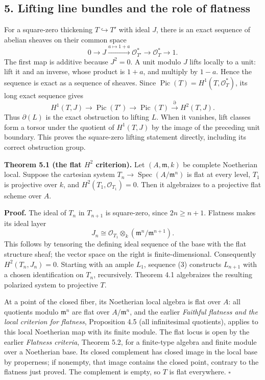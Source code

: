 \documentclass[11pt]{article}
\begin{document}
\subsection{5. Lifting line bundles and the role of
flatness}\label{lifting-line-bundles-and-the-role-of-flatness}

For a square-zero thickening \(T\hookrightarrow T'\) with ideal \(J\),
there is an exact sequence of abelian sheaves on their common space \[
0\to J\xrightarrow{a\mapsto1+a}\mathcal O_{T'}^*
\to\mathcal O_T^*\to1.
\tag{2}
\] The first map is additive because \(J^2=0\). A unit modulo \(J\)
lifts locally to a unit: lift it and an inverse, whose product is
\(1+a\), and multiply by \(1-a\). Hence the sequence is exact as a
sequence of sheaves. Since
\(\operatorname{Pic}(T)=H^1(T,\mathcal O_T^*)\), its long exact sequence
gives \[
H^1(T,J)\to\operatorname{Pic}(T')\to\operatorname{Pic}(T)
\xrightarrow{\partial}H^2(T,J).
\tag{3}
\] Thus \(\partial(L)\) is the exact obstruction to lifting \(L\). When
it vanishes, lift classes form a torsor under the quotient of
\(H^1(T,J)\) by the image of the preceding unit boundary. This proves
the square-zero lifting statement directly, including its correct
obstruction group.

\textbf{Theorem 5.1 (the flat \(H^2\) criterion).} Let
\((A,\mathfrak m,k)\) be complete Noetherian local. Suppose the
cartesian system \(T_n\to\operatorname{Spec}(A/\mathfrak m^n)\) is flat
at every level, \(T_1\) is projective over \(k\), and
\(H^2(T_1,\mathcal O_{T_1})=0\). Then it algebraizes to a projective
flat scheme over \(A\).

\textbf{Proof.} The ideal of \(T_n\) in \(T_{n+1}\) is square-zero,
since \(2n\geq n+1\). Flatness makes its ideal layer \[
J_n\cong\mathcal O_{T_1}\otimes_k
(\mathfrak m^n/\mathfrak m^{n+1}).
\] This follows by tensoring the defining ideal sequence of the base
with the flat structure sheaf; the vector space on the right is
finite-dimensional. Consequently \(H^2(T_n,J_n)=0\). Starting with an
ample \(L_1\), sequence (3) constructs \(L_{n+1}\) with a chosen
identification on \(T_n\), recursively. Theorem 4.1 algebraizes the
resulting polarized system to projective \(T\).

At a point of the closed fiber, its Noetherian local algebra is flat
over \(A\): all quotients modulo \(\mathfrak m^n\) are flat over
\(A/\mathfrak m^n\), and the earlier \emph{Faithful flatness and the
local criterion for flatness}, Proposition 4.5 (all infinitesimal
quotients), applies to this local Noetherian map with its finite module.
The flat locus is open by the earlier \emph{Flatness criteria}, Theorem
5.2, for a finite-type algebra and finite module over a Noetherian base.
Its closed complement has closed image in the local base by properness;
if nonempty, that image contains the closed point, contrary to the
flatness just proved. The complement is empty, so \(T\) is flat
everywhere. \(\square\)
\end{document}
